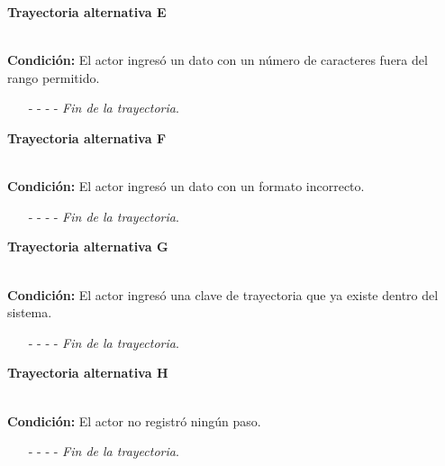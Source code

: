 \hypertarget{CU12-1-1-1:TAE}{\textbf{Trayectoria alternativa E}}\\
\noindent \textbf{Condición:} El actor ingresó un dato con un número de caracteres fuera del rango permitido.
\begin{enumerate}
	\UCpaso[\UCsist] Muestra el mensaje  señalando el campo que presenta el error en la pantalla .
	\UCpaso Regresa al paso \ref{CU12.1.1.1-P16} de la trayectoria principal.
	\item[- -] - - {\em {Fin de la trayectoria}}.%
\end{enumerate}
\hypertarget{CU12-1-1-1:TAF}{\textbf{Trayectoria alternativa F}}\\
\noindent \textbf{Condición:} El actor ingresó un dato con un formato incorrecto.
\begin{enumerate}
	\UCpaso[\UCsist] Muestra el mensaje  señalando el campo que presenta el error en la pantalla .
	\UCpaso Regresa al paso \ref{CU12.1.1.1-P16} de la trayectoria principal.
	\item[- -] - - {\em {Fin de la trayectoria}}.
\end{enumerate}
\hypertarget{CU2-1-1-1:TAG}{\textbf{Trayectoria alternativa G}}\\
\noindent \textbf{Condición:} El actor ingresó una clave de trayectoria que ya existe dentro del sistema.
\begin{enumerate}
	\UCpaso[\UCsist] Muestra el mensaje  señalando el campo que presenta la duplicidad en la pantalla .
	\UCpaso Regresa al paso \ref{CU12.1.1.1-P16} de la trayectoria principal.
	\item[- -] - - {\em {Fin de la trayectoria}}.
\end{enumerate}
\hypertarget{CU12-1-1-1:TAH}{\textbf{Trayectoria alternativa H}}\\
\noindent \textbf{Condición:} El actor no registró ningún paso.
\begin{enumerate}
	\UCpaso[\UCsist] Muestra el mensaje  en la sección de pasos de la pantalla .
	\UCpaso Regresa al paso \ref{CU12.1.1.1-P16} de la trayectoria principal.
	\item[- -] - - {\em {Fin de la trayectoria}}.
\end{enumerate}
